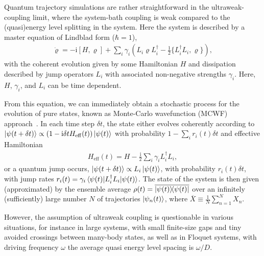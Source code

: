 \documentclass[twocolumn,prl,superscriptaddress]{revtex4-2}
\renewcommand{\i}{\mathrm i}
\begin{document}
Quantum trajectory simulations are rather straightforward in the ultraweak-coupling limit, where the system-bath coupling is weak compared to the (quasi)energy level splitting in the system. Here the system is described by a master equation of Lindblad form ($\hbar=1$),  
\begin{align}
	\dot \varrho = -\i[H, \varrho] + \sum\limits_{i} \gamma_i \left( L_i \varrho L_i^\dagger - \frac{1}{2} \{ L_i^\dagger L_i,\varrho \} \right) ,
	\label{eq:pseudo_lindblad}
\end{align}
with the coherent evolution given by some Hamiltonian $H$ and dissipation described by jump operators $L_i$ with associated non-negative strengths $\gamma_i$. Here, $H$, $\gamma_i$, and $L_i$ can be time dependent. 

From this equation, we can immediately obtain a stochastic process for the evolution of pure states, known as Monte-Carlo wavefunction (MCWF) approach~\cite{Dalibard92,Kmolmer1993,GardinerZoller1992:1,GardinerZoller1992:2,NGisin1992:1,NGisin1992:2,HCarmicheal1999,ADaley2014}. In each time step $\delta t$, the state either evolves coherently according to  $\ket{\psi(t+\delta t)} \propto (1-\i \delta t H_\mathrm{eff}(t))\ket{\psi(t)}$  with probability $1- \sum_i r_i(t) \delta t$ and effective Hamiltonian 
\begin{align} 
	H_\mathrm{eff}(t) = H - \frac{\i}{2} \sum_i \gamma_i L_i^\dagger L_i,
	\label{eq:eff_Hamiltonian}
\end{align}
or a quantum jump occurs, $\ket{\psi(t+\delta t)} \propto L_i \ket{\psi(t)}$, with probability $r_i(t) \delta t$, with jump rates $r_i(t) = \gamma_i \matrixel{\psi(t)}{L_i^\dag L_i }{\psi(t)}$. The state of the system is then given (approximated) by the ensemble average $\rho(t)= \overline{\dyad{\psi(t)}}$ over an infinitely (sufficiently) large number $N$ of trajectories $\ket{\psi_n(t)}$, where $\overline{X} \equiv\frac{1}{N}\sum_{n=1}^N X_n$. 

However, the assumption of ultraweak coupling is questionable in various situations, for instance in large systems, with small finite-size gaps and tiny avoided crossings between many-body states, as well as in Floquet systems, with driving frequency $\omega$ the average quasi energy level spacing is $\omega/D$. 
\end{document}

